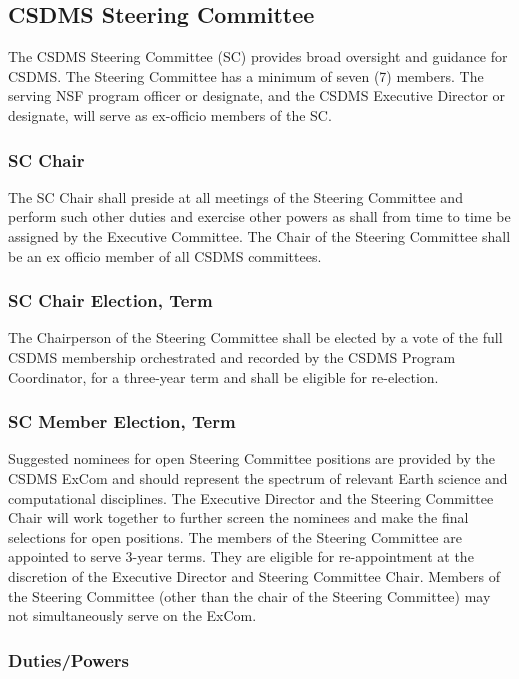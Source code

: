 \documentclass[11pt, oneside]{article}   	%
\begin{document}
\subsection{CSDMS Steering Committee}

The CSDMS Steering Committee (SC) provides broad oversight and guidance for CSDMS. The Steering Committee has a minimum of seven (7) members.  The serving NSF program officer or designate, and the CSDMS Executive Director or designate, will serve as ex-officio members of the SC.

\subsubsection{SC Chair}\label{sec:scchair}
	
The SC Chair shall preside at all meetings of the Steering Committee and perform such other duties and exercise other powers as shall from time to time be assigned by the Executive Committee. The Chair of the Steering Committee shall be an ex officio member of all CSDMS committees.  
\subsubsection{SC Chair Election, Term}

The Chairperson of the Steering Committee shall be elected by a vote of the full CSDMS membership orchestrated and recorded by the CSDMS Program Coordinator, for a three-year term and shall be eligible for re-election.

\subsubsection{SC Member Election, Term}

Suggested nominees for open Steering Committee positions are provided by the CSDMS ExCom and should represent the spectrum of relevant Earth science and computational disciplines.  The Executive Director and the Steering Committee Chair will work together to further screen the nominees and make the final selections for open positions. The members of the Steering Committee are appointed to serve 3-year terms.  They are eligible for re-appointment at the discretion of the Executive Director and Steering Committee Chair. Members of the Steering Committee (other than the chair of the Steering Committee) may not simultaneously serve on the ExCom. 

\subsubsection{Duties/Powers}
	
\end{document}
